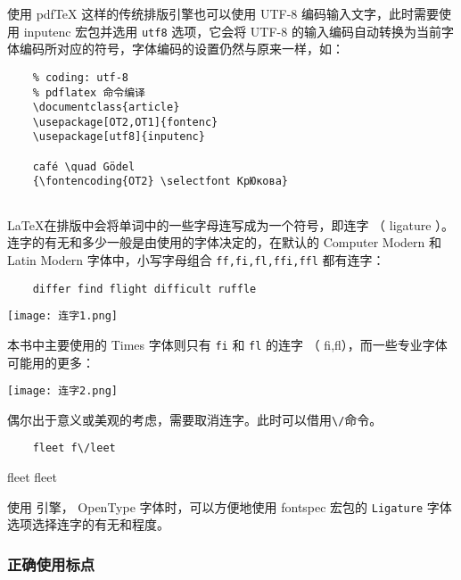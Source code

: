 使用 pdfTeX 这样的传统排版引擎也可以使用 UTF-8 编码输入文字，此时需要使用 inputenc 宏包并选用 \verb|utf8| 选项，它会将 UTF-8 的输入编码自动转换为当前字体编码所对应的符号，字体编码的设置仍然与原来一样，如：
\begin{lstlisting}
    % coding: utf-8
    % pdflatex 命令编译
    \documentclass{article}
    \usepackage[OT2,OT1]{fontenc}
    \usepackage[utf8]{inputenc}
    
    café \quad Gödel
    {\fontencoding{OT2} \selectfont КpЮковa}
    
\end{lstlisting}

\LaTeX 在排版中会将单词中的一些字母连写成为一个符号，即连字 （ ligature ）。连字的有无和多少一般是由使用的字体决定的，在默认的 Computer Modern 和 Latin Modern 字体中，小写字母组合 \verb|ff,fi,fl,ffi,ffl| 都有连字：

\begin{minipage}[t]{0.45\textwidth}
    \begin{lstlisting}
    differ find flight difficult ruffle 
    \end{lstlisting}
\end{minipage}
\hfill
\begin{minipage}[c]{0.45\textwidth}
    \hspace{0.5cm}
    \texttt{[image: 连字1.png]}
\end{minipage}

本书中主要使用的 Times 字体则只有 \verb|fi| 和 \verb|fl| 的连字 （ fi,fl），而一些专业字体可能用的更多：

\texttt{[image: 连字2.png]}

偶尔出于意义或美观的考虑，需要取消连字。此时可以借用\verb|\/|命令。

\begin{minipage}[t]{0.45\textwidth}
    \begin{lstlisting}
    fleet f\/leet
    \end{lstlisting}
\end{minipage}
\hfill
\begin{minipage}[b]{0.45\textwidth}
    \hspace{0.5cm}

    fleet f\/leet
\end{minipage}

使用 \XeLaTeX 引擎， OpenType 字体时，可以方便地使用 fontspec 宏包的 \verb|Ligature| 字体选项选择连字的有无和程度。

\subsubsection{正确使用标点}

